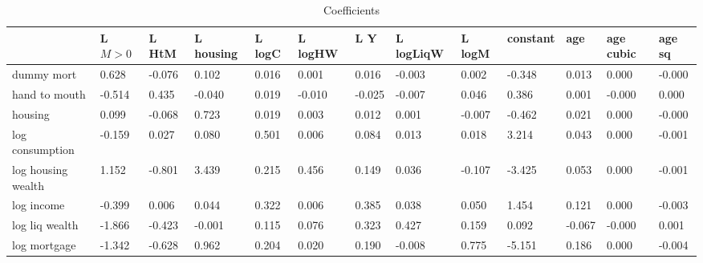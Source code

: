 \begin{table}[htbp]
\caption{\label{clabel} Coefficients}\centering\medskip
\begin{tabular}{lllllllllllll} \hline \hline
 & L $M>0$  & L HtM  & L housing  & L logC  & L logHW  & L Y  & L logLiqW  & L logM  & constant  & age  & age cubic  & age sq  \\  \hline 
dummy mort &     0.628 &    -0.076 &     0.102 &     0.016 &     0.001 &     0.016 &    -0.003 &     0.002 &    -0.348 &     0.013 &     0.000 &    -0.000 \\  
hand to mouth &    -0.514 &     0.435 &    -0.040 &     0.019 &    -0.010 &    -0.025 &    -0.007 &     0.046 &     0.386 &     0.001 &    -0.000 &     0.000 \\  
housing &     0.099 &    -0.068 &     0.723 &     0.019 &     0.003 &     0.012 &     0.001 &    -0.007 &    -0.462 &     0.021 &     0.000 &    -0.000 \\  
log consumption &    -0.159 &     0.027 &     0.080 &     0.501 &     0.006 &     0.084 &     0.013 &     0.018 &     3.214 &     0.043 &     0.000 &    -0.001 \\  
log housing wealth &     1.152 &    -0.801 &     3.439 &     0.215 &     0.456 &     0.149 &     0.036 &    -0.107 &    -3.425 &     0.053 &     0.000 &    -0.001 \\  
log income &    -0.399 &     0.006 &     0.044 &     0.322 &     0.006 &     0.385 &     0.038 &     0.050 &     1.454 &     0.121 &     0.000 &    -0.003 \\  
log liq wealth &    -1.866 &    -0.423 &    -0.001 &     0.115 &     0.076 &     0.323 &     0.427 &     0.159 &     0.092 &    -0.067 &    -0.000 &     0.001 \\  
log mortgage &    -1.342 &    -0.628 &     0.962 &     0.204 &     0.020 &     0.190 &    -0.008 &     0.775 &    -5.151 &     0.186 &     0.000 &    -0.004 \\  
\hline \hline \end{tabular}
\end{table}
